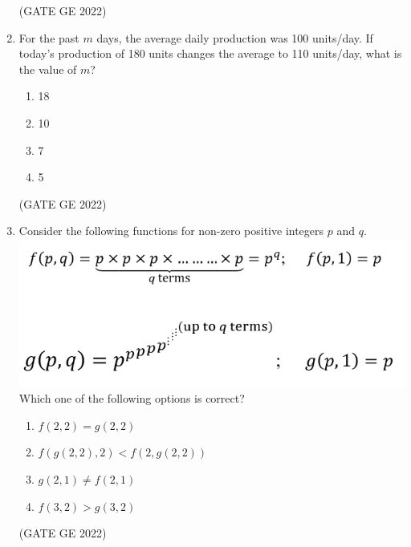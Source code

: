 \documentclass[a4paper, 11pt]{article}
\begin{document}
\begin{enumerate}
\hfill (GATE GE 2022)

\item For the past $m$ days, the average daily production was 100 units/day. If today’s production of 180 units changes the average to 110 units/day, what is the value of $m$?
\begin{enumerate}
    \item 18
    \item 10
    \item 7
    \item 5
\end{enumerate}

\hfill (GATE GE 2022)

\item Consider the following functions for non-zero positive integers $p$ and $q$.
\centering \includegraphics[width=\columnwidth]{figs/fig_8.png}
Which one of the following options is correct?
\begin{enumerate}
    \item $f(2,2) = g(2,2)$
    \item $f(g(2,2), 2) < f(2, g(2,2))$
    \item $g(2,1) \ne f(2,1)$
    \item $f(3,2) > g(3,2)$
\end{enumerate}

\hfill (GATE GE 2022)


\end{enumerate}
\end{document}
